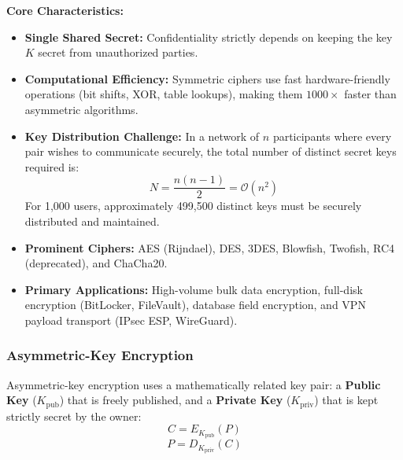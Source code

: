\textbf{Core Characteristics:}
\begin{itemize}
\item \textbf{Single Shared Secret:} Confidentiality strictly depends on keeping the key $K$ secret from unauthorized parties.
\item \textbf{Computational Efficiency:} Symmetric ciphers use fast hardware-friendly operations (bit shifts, XOR, table lookups), making them $1000\times$ faster than asymmetric algorithms.
\item \textbf{Key Distribution Challenge:} In a network of $n$ participants where every pair wishes to communicate securely, the total number of distinct secret keys required is:
\[ N = \frac{n(n-1)}{2} = \mathcal{O}(n^2) \]
For 1,000 users, approximately 499,500 distinct keys must be securely distributed and maintained.
\item \textbf{Prominent Ciphers:} AES (Rijndael), DES, 3DES, Blowfish, Twofish, RC4 (deprecated), and ChaCha20.
\item \textbf{Primary Applications:} High-volume bulk data encryption, full-disk encryption (BitLocker, FileVault), database field encryption, and VPN payload transport (IPsec ESP, WireGuard).
\end{itemize}

\subsubsection{Asymmetric-Key Encryption}

Asymmetric-key encryption uses a mathematically related key pair: a \textbf{Public Key} ($K_{\text{pub}}$) that is freely published, and a \textbf{Private Key} ($K_{\text{priv}}$) that is kept strictly secret by the owner:
\[ C = E_{K_{\text{pub}}}(P) \]
\[ P = D_{K_{\text{priv}}}(C) \]

